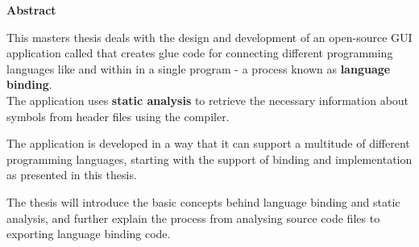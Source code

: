 \thispagestyle{empty}
\textbf{Abstract}

This masters thesis deals with the design and development of an open-source GUI application called  that creates glue code for connecting different programming languages like  and  within in a single program - a process known as \textbf{language binding}.\\
The application uses \textbf{static analysis} to retrieve the necessary information about symbols from  header files using the   compiler.

The application is developed in a way that it can support a multitude of different programming languages, starting with the support of binding  and  implementation  as presented in this thesis.

The thesis will introduce the basic concepts behind language binding and static analysis, and further explain the process from analysing source code files to exporting language binding code.